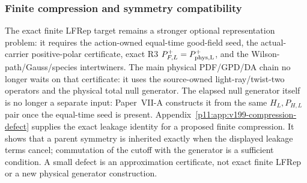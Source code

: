 \documentclass[12pt,a4paper]{article}
\begin{document}
\subsubsection{Finite compression and symmetry compatibility}
\label{p11:sec:v199-compression-handoff}
The exact finite LFRep target remains a stronger optional representation problem:
it requires the action-owned equal-time good-field seed, the actual-carrier
positive-polar certificate, exact R3 $P_{F,L}^+=P_{\rm phys,L}^+$, and the
Wilson-path/Gauss/species intertwiners.  The main physical PDF/GPD/DA chain no
longer waits on that certificate: it uses the source-owned light-ray/twist-two
operators and the physical total null generator.
The elapsed null generator itself is no longer a separate input: Paper~VII-A
constructs it from the same $H_L,P_{H,L}$ pair once the equal-time seed is
present.
Appendix~\ref{p11:app:v199-compression-defect} supplies the exact leakage
identity for a proposed finite compression.  It shows that a parent symmetry
is inherited exactly when the displayed leakage terms cancel; commutation of
the cutoff with the generator is a sufficient condition.  A small defect is
an approximation certificate, not exact finite LFRep or a new physical
generator construction.


\end{document}
